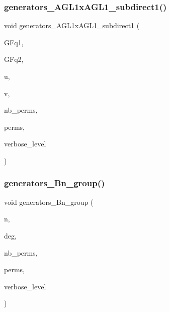 \subsubsection{\texorpdfstring{generators\+\_\+\+A\+G\+L1x\+A\+G\+L1\+\_\+subdirect1()}{generators\_AGL1xAGL1\_subdirect1()}}
{\footnotesize\ttfamily void generators\+\_\+\+A\+G\+L1x\+A\+G\+L1\+\_\+subdirect1 (\begin{DoxyParamCaption}\item[{\mbox{\hyperlink{classfinite__field}{finite\+\_\+field}} \&}]{G\+Fq1,  }\item[{\mbox{\hyperlink{classfinite__field}{finite\+\_\+field}} \&}]{G\+Fq2,  }\item[{\mbox{\hyperlink{galois_8h_a09fddde158a3a20bd2dcadb609de11dc}{I\+NT}}}]{u,  }\item[{\mbox{\hyperlink{galois_8h_a09fddde158a3a20bd2dcadb609de11dc}{I\+NT}}}]{v,  }\item[{\mbox{\hyperlink{galois_8h_a09fddde158a3a20bd2dcadb609de11dc}{I\+NT}} \&}]{nb\+\_\+perms,  }\item[{\mbox{\hyperlink{galois_8h_a09fddde158a3a20bd2dcadb609de11dc}{I\+NT}} $\ast$\&}]{perms,  }\item[{\mbox{\hyperlink{galois_8h_a09fddde158a3a20bd2dcadb609de11dc}{I\+NT}}}]{verbose\+\_\+level }\end{DoxyParamCaption})}

\mbox{\label{group__generators_8_c_ab85456e84c0c36b98cc776f7ccf27808}} 
\subsubsection{\texorpdfstring{generators\+\_\+\+Bn\+\_\+group()}{generators\_Bn\_group()}}
{\footnotesize\ttfamily void generators\+\_\+\+Bn\+\_\+group (\begin{DoxyParamCaption}\item[{\mbox{\hyperlink{galois_8h_a09fddde158a3a20bd2dcadb609de11dc}{I\+NT}}}]{n,  }\item[{\mbox{\hyperlink{galois_8h_a09fddde158a3a20bd2dcadb609de11dc}{I\+NT}} \&}]{deg,  }\item[{\mbox{\hyperlink{galois_8h_a09fddde158a3a20bd2dcadb609de11dc}{I\+NT}} \&}]{nb\+\_\+perms,  }\item[{\mbox{\hyperlink{galois_8h_a09fddde158a3a20bd2dcadb609de11dc}{I\+NT}} $\ast$\&}]{perms,  }\item[{\mbox{\hyperlink{galois_8h_a09fddde158a3a20bd2dcadb609de11dc}{I\+NT}}}]{verbose\+\_\+level }\end{DoxyParamCaption})}

